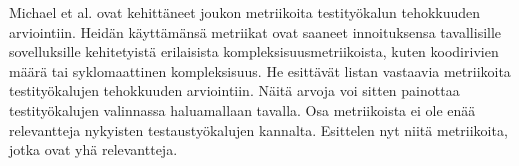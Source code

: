 Michael et al. \cite{michael02} ovat kehittäneet joukon metriikoita testityökalun tehokkuuden arviointiin. Heidän käyttämänsä metriikat ovat saaneet innoituksensa tavallisille sovelluksille kehitetyistä erilaisista kompleksisuusmetriikoista, kuten koodirivien määrä tai syklomaattinen kompleksisuus. He esittävät listan vastaavia metriikoita testityökalujen tehokkuuden arviointiin. Näitä arvoja voi sitten painottaa testityökalujen valinnassa haluamallaan tavalla. Osa metriikoista ei ole enää relevantteja nykyisten testaustyökalujen kannalta. Esittelen nyt niitä metriikoita, jotka ovat yhä relevantteja.

